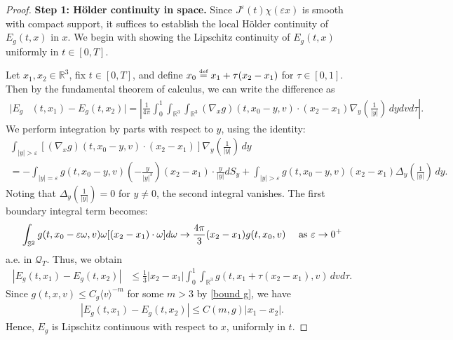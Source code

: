 \documentclass[reqno,11pt,final]{amsart}
\theoremstyle{plain}
\numberwithin{equation}{section}
\numberwithin{theorem}{section}
\newcommand{\eqdef }{\overset{\mbox{\tiny{def}}}{=}}
\begin{document}
\begin{proof}
\textbf{Step 1: H\"older continuity in space.}
Since $J^\varepsilon(t)\chi(\varepsilon x)$ is smooth with compact support, it suffices to establish the local H\"older continuity of $E_g(t,x)$ in $x$. We begin with showing the Lipschitz continuity of $E_g(t,x)$ uniformly in $t\in[0,T]$.

Let $x_1,x_2\in\mathbb{R}^3$, fix $t\in[0,T]$, and define $x_0 \eqdef x_1 + \tau(x_2 - x_1)$ for $\tau\in[0,1]$. Then by the fundamental theorem of calculus, we can write the difference as
\begin{align*}
|E_g&(t,x_1) - E_g(t,x_2)| \nonumber
= \left|\frac{1}{4\pi}\int_0^1\int_{\mathbb{R}^3} \int_{\mathbb{R}^3} (\nabla_xg)(t,x_0 - y,v)\cdot(x_2-x_1) \nabla_y\left(\frac{1}{|y|} \right)\,dydvd\tau\right|.
\end{align*}We perform integration by parts with respect to $y$, using the identity:
\begin{multline*}
\int_{|y|>\varepsilon} [(\nabla_xg)(t,x_0 - y, v)\cdot(x_2-x_1)]\nabla_y\left(\frac{1}{|y|}\right)\,dy \\
= -\int_{|y|=\varepsilon} g(t,x_0-y,v) \left(-\frac{y}{|y|^3}\right)(x_2 - x_1) \cdot \frac{y}{|y|}dS_y 
+ \int_{|y|>\varepsilon} g(t,x_0-y,v)(x_2 - x_1)\Delta_y\left(\frac{1}{|y|}\right)\,dy.
\end{multline*}Noting that $\Delta_y \left(\frac{1}{|y|}\right) =0$ for $y\neq0$, the second integral vanishes. The first boundary integral term becomes:
\begin{align*}
\int_{\mathbb{S}^2}g(t,x_0-\varepsilon \omega,v) \omega [(x_2 - x_1)\cdot \omega]d\omega\to \frac{4\pi}{3}(x_2-x_1)g(t,x_0,v) \quad \textup{ as }\varepsilon\to0^+ 
\end{align*}a.e. in $\mathcal{Q}_T$. Thus, we obtain
\begin{align*}
|E_g(t,x_1) - E_g(t,x_2)|&\le \frac{1}{3}|x_2 - x_1| \int_0^1 \int_{\mathbb{R}^3} g(t,x_1 + \tau(x_2-x_1), v)\,dvd\tau.
\end{align*}Since $g(t,x,v)\le C_g\langle v\rangle^{-m}$ for some $m>3$ by \eqref{bound g}, we have
\begin{align*}
|E_g(t,x_1) - E_g(t,x_2)| \le C(m,g)|x_1 - x_2|.
\end{align*}Hence, $E_g$ is Lipschitz continuous with respect to $x$, uniformly in $t$.


\end{proof}
\end{document}
